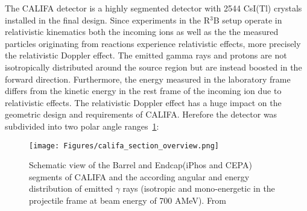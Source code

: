 The CALIFA detector is a highly segmented detector with 2544 CsI(Tl) crystals installed in the final design. Since experiments in the R$^3$B setup operate in relativistic kinematics both the incoming ions as well as the the measured particles originating from reactions experience relativistic effects, more precisely the relativistic Doppler effect. The emitted gamma rays and protons are not isotropically distributed around the source region but are instead boosted in the forward direction. Furthermore, the energy measured in the laboratory frame differs from the kinetic energy in the rest frame of the incoming ion due to relativistic effects.\newline
The relativistic Doppler effect has a huge impact on the geometric design and requirements of CALIFA. Herefore the detector was subdivided into two polar angle ranges~\ref{fig:califa_sec}:
\begin{figure}[htpb]
    \centering
    \texttt{[image: Figures/califa\_section\_overview.png]}
    \caption{
    Schematic view of the Barrel and Endcap(iPhos and CEPA) segments of CALIFA and the according angular and energy distribution of emitted $\gamma$ rays (isotropic and mono-energetic in the projectile frame at beam energy of 700 AMeV). From \cite{tdr:barrel}
    }
    \label{fig:califa_sec}
\end{figure}
